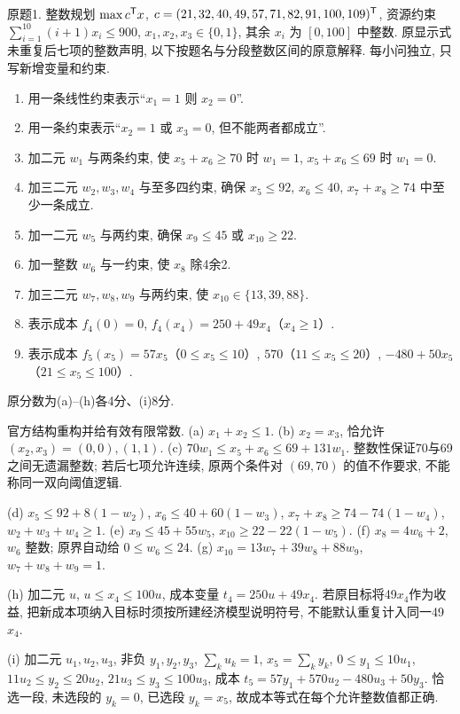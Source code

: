 \begin{exercise}\label{ass:15053-rec6-q1}
原题1. 整数规划 $\max c^{\mathsf T} x$, $c=(21,32,40,49,57,71,82,91,100,109)^{\mathsf T}$, 资源约束 $\sum_{i=1}^{10}(i+1)x_i\le900$, $x_1,x_2,x_3\in\{0,1\}$, 其余 $x_i$ 为 $[0,100]$ 中整数. 原显示式未重复后七项的整数声明, 以下按题名与分段整数区间的原意解释. 每小问独立, 只写新增变量和约束.
\begin{enumerate}[label=(\alph*)]
\item 用一条线性约束表示“$x_1=1$ 则 $x_2=0$”.
\item 用一条约束表示“$x_2=1$ 或 $x_3=0$, 但不能两者都成立”.
\item 加二元 $w_1$ 与两条约束, 使 $x_5+x_6\ge70$ 时 $w_1=1$, $x_5+x_6\le69$ 时 $w_1=0$.
\item 加三二元 $w_2,w_3,w_4$ 与至多四约束, 确保 $x_5\le92$, $x_6\le40$, $x_7+x_8\ge74$ 中至少一条成立.
\item 加一二元 $w_5$ 与两约束, 确保 $x_9\le45$ 或 $x_{10}\ge22$.
\item 加一整数 $w_6$ 与一约束, 使 $x_8$ 除4余2.
\item 加三二元 $w_7,w_8,w_9$ 与两约束, 使 $x_{10}\in\{13,39,88\}$.
\item 表示成本 $f_4(0)=0$, $f_4(x_4)=250+49x_4$（$x_4\ge1$）.
\item 表示成本 $f_5(x_5)=57x_5$（$0\le x_5\le10$）, $570$（$11\le x_5\le20$）, $-480+50x_5$（$21\le x_5\le100$）.
\end{enumerate}
原分数为(a)--(h)各4分、(i)8分.
\end{exercise}
\begin{solution}
官方结构重构并给有效有限常数. (a) $x_1+x_2\le1$. (b) $x_2=x_3$, 恰允许 $(x_2,x_3)=(0,0),(1,1)$. (c) $70w_1\le x_5+x_6\le69+131w_1$. 整数性保证70与69之间无遗漏整数; 若后七项允许连续, 原两个条件对 $(69,70)$ 的值不作要求, 不能称同一双向阈值逻辑.

(d) $x_5\le92+8(1-w_2)$, $x_6\le40+60(1-w_3)$, $x_7+x_8\ge74-74(1-w_4)$, $w_2+w_3+w_4\ge1$. (e) $x_9\le45+55w_5$, $x_{10}\ge22-22(1-w_5)$. (f) $x_8=4w_6+2$, $w_6$ 整数; 原界自动给 $0\le w_6\le24$. (g) $x_{10}=13w_7+39w_8+88w_9$, $w_7+w_8+w_9=1$.

(h) 加二元 $u$, $u\le x_4\le100u$, 成本变量 $t_4=250u+49x_4$. 若原目标将49$x_4$作为收益, 把新成本项纳入目标时须按所建经济模型说明符号, 不能默认重复计入同一49$x_4$.

(i) 加二元 $u_1,u_2,u_3$, 非负 $y_1,y_2,y_3$, $\sum_ku_k=1$, $x_5=\sum_ky_k$, $0\le y_1\le10u_1$, $11u_2\le y_2\le20u_2$, $21u_3\le y_3\le100u_3$, 成本 $t_5=57y_1+570u_2-480u_3+50y_3$. 恰选一段, 未选段的 $y_k=0$, 已选段 $y_k=x_5$, 故成本等式在每个允许整数值都正确.
\end{solution}

